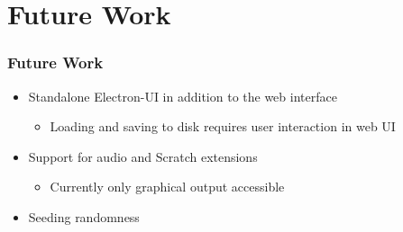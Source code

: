 \section{Future Work}

\begin{frame}
\end{frame}

%
%

\begin{frame}\frametitle{Future Work}
    \begin{itemize}
        \item Standalone Electron-UI in addition to the web interface
            \begin{itemize}
                \item Loading and saving to disk requires user interaction in web UI
            \end{itemize}

        \bigskip

        \item Support for audio and Scratch extensions
            \begin{itemize}
                \item Currently only graphical output accessible
            \end{itemize}

        \bigskip

        \item Seeding randomness
    \end{itemize}
\end{frame}

\begin{frame}
\end{frame}
